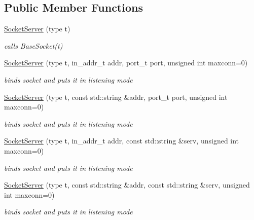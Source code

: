 \subsection*{Public Member Functions}
\begin{CompactItemize}
\item 
\hypertarget{classsocketpp_1_1SocketServer_3a6955b6d5617457cf31206ea9492786}{
\hyperlink{classsocketpp_1_1SocketServer_3a6955b6d5617457cf31206ea9492786}{SocketServer} (type t)}
\label{classsocketpp_1_1SocketServer_3a6955b6d5617457cf31206ea9492786}

\begin{CompactList}\small\item\em calls BaseSocket(t) \item\end{CompactList}\item 
\hyperlink{classsocketpp_1_1SocketServer_73c5125f9e5a6cf03dc15f6d4250e345}{SocketServer} (type t, in\_\-addr\_\-t addr, port\_\-t port, unsigned int maxconn=0)
\begin{CompactList}\small\item\em binds socket and puts it in listening mode \item\end{CompactList}\item 
\hyperlink{classsocketpp_1_1SocketServer_2b43397fd614dc7953559d7372f1c6ca}{SocketServer} (type t, const std::string \&addr, port\_\-t port, unsigned int maxconn=0)
\begin{CompactList}\small\item\em binds socket and puts it in listening mode \item\end{CompactList}\item 
\hyperlink{classsocketpp_1_1SocketServer_d1c5c7df1da1c52df7a1fae7df4488b1}{SocketServer} (type t, in\_\-addr\_\-t addr, const std::string \&serv, unsigned int maxconn=0)
\begin{CompactList}\small\item\em binds socket and puts it in listening mode \item\end{CompactList}\item 
\hyperlink{classsocketpp_1_1SocketServer_ed1844f6c0c6e9e3b69e69903355d171}{SocketServer} (type t, const std::string \&addr, const std::string \&serv, unsigned int maxconn=0)
\begin{CompactList}\small\item\em binds socket and puts it in listening mode \item\end{CompactList}\item 

\end{CompactItemize}
